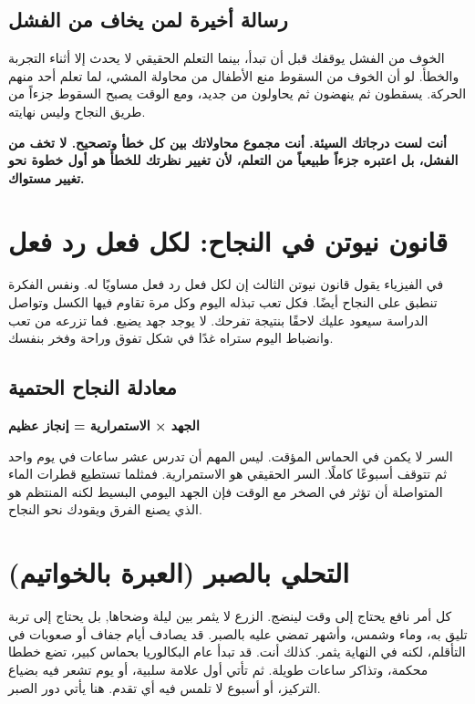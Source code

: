\documentclass[12pt,a4paper]{book}
\newcommand{\importantAr}[1]{%
	\begin{important}
		\bfseries #1
	\end{important}
}
\begin{document}
	\subsection{رسالة أخيرة لمن يخاف من الفشل}
	
	الخوف من الفشل يوقفك قبل أن تبدأ، بينما التعلم الحقيقي لا يحدث إلا أثناء التجربة والخطأ. لو أن الخوف من السقوط منع الأطفال من محاولة المشي، لما تعلم أحد منهم الحركة. يسقطون ثم ينهضون ثم يحاولون من جديد، ومع الوقت يصبح السقوط جزءاً من طريق النجاح وليس نهايته.
	
	\importantAr{
		أنت لست درجاتك السيئة. أنت مجموع محاولاتك بين كل خطأ وتصحيح. لا تخف من الفشل، بل اعتبره جزءاً طبيعياً من التعلم، لأن تغيير نظرتك للخطأ هو أول خطوة نحو تغيير مستواك.
	}
	\section{قانون نيوتن في النجاح: لكل فعل رد فعل}
	
في الفيزياء يقول قانون نيوتن الثالث إن لكل فعل رد فعل مساويًا له. ونفس الفكرة تنطبق على النجاح أيضًا. فكل تعب تبذله اليوم وكل مرة تقاوم فيها الكسل وتواصل الدراسة سيعود عليك لاحقًا بنتيجة تفرحك. لا يوجد جهد يضيع. فما تزرعه من تعب وانضباط اليوم ستراه غدًا في شكل تفوق وراحة وفخر بنفسك.

	\subsection*{معادلة النجاح الحتمية}
	\begin{center}
		\Large
		\textbf{الجهد × الاستمرارية = إنجاز عظيم}
	\end{center}
السر لا يكمن في الحماس المؤقت. ليس المهم أن تدرس عشر ساعات في يوم واحد ثم تتوقف أسبوعًا كاملًا. السر الحقيقي هو الاستمرارية. فمثلما تستطيع قطرات الماء المتواصلة أن تؤثر في الصخر مع الوقت فإن الجهد اليومي البسيط لكنه المنتظم هو الذي يصنع الفرق ويقودك نحو النجاح.
	

	\section{التحلي بالصبر (العبرة بالخواتيم)}
	\label{sec:patience}
	
	
	كل أمر نافع يحتاج إلى وقت لينضج. الزرع لا يثمر بين ليلة وضحاها, بل يحتاج إلى تربة تليق به، وماء وشمس، وأشهر تمضي عليه بالصبر. قد يصادف أيام جفاف أو صعوبات في التأقلم، لكنه في النهاية يثمر. كذلك أنت. قد تبدأ عام البكالوريا بحماس كبير، تضع خططا محكمة، وتذاكر ساعات طويلة. ثم تأتي أول علامة سلبية، أو يوم تشعر فيه بضياع التركيز، أو أسبوع لا تلمس فيه أي تقدم. هنا يأتي دور الصبر.
\end{document}
